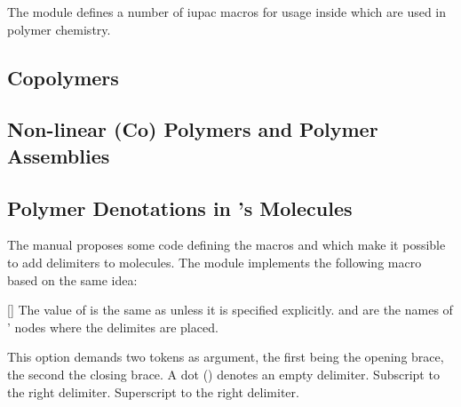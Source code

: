 \documentclass{chemmacros-manual}
\begin{document}
The  module defines a number of \ac{iupac} macros for
usage inside  which are used in polymer chemistry.

\subsection{Copolymers}
\begin{commands}
\end{commands}

\subsection{Non-linear (Co) Polymers and Polymer Assemblies}
\begin{commands}
\end{commands}

\subsection{Polymer Denotations in 's Molecules}
The  manual proposes some code defining the macros
 and  which make it possible to add
delimiters to  molecules.  The  module
implements the following macro based on the same idea:
\begin{commands}
  []
    The value of  is the same as  unless it is
    specified explicitly.   and  are the
    names of \TikZ' nodes where the delimites are placed.
\end{commands}
\begin{options}
  \Default{[]}
    This option demands two tokens as argument, the first being the opening
    brace, the second the closing brace.  A dot () denotes an empty
    delimiter.
    Subscript to the right delimiter.
    Superscript to the right delimiter.
\end{options}
\end{document}
